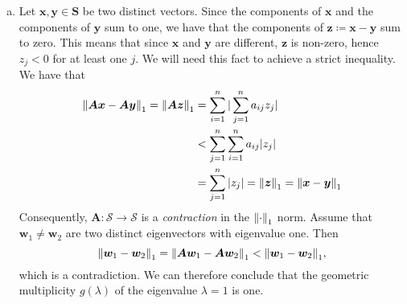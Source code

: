 \documentclass[12pt, oneside, article, a4paper]{memoir}
\newcommand{\mat}[1]{\bm{#1}}
\begin{document}
\begin{enumerate}[a)]
    \item Let \( \mat{x}, \mat{y} \in \mat{S} \) be two distinct vectors. Since
        the components of \( \mat{x} \) and the components of \( \mat{y} \) sum
        to one, we have that the components of \( \mat{z} \coloneqq \mat{x} -
        \mat{y} \) sum to zero. This means that since \( \mat{x} \) and \(
        \mat{y} \) are different, \( \mat{z} \) is non-zero, hence \(z_j < 0 \)
        for at least one \( j \). We will need this fact to achieve a strict
        inequality. We have that
        \begin{align}
            \begin{split}
            \norm{\mat{Ax} - \mat{Ay}}_1 = \norm{\mat{Az}}_1 &= \sum_{i = 1}^n |\sum_{j=1}^n a_{ij} z_j| \\
                                                             &< \sum_{j = 1}^n \sum_{i=1}^n a_{ij}|z_j| \\ 
                                                             &= \sum_{j=1}^n |z_j| = \norm{\mat{z}}_1 = \norm{\mat{x} - \mat{y}}_1
    \end{split}
        \end{align}
        Consequently, \( \mat{A} \colon \mathcal{S} \to \mathcal{S} \) is a
        \emph{contraction} in the \( \norm{\cdot}_1 \) norm.  Assume that \(
        \mat{w}_1 \neq \mat{w}_2 \) are two distinct eigenvectors with
        eigenvalue one. Then
        \begin{equation}
            \norm{\mat{w}_1 - \mat{w}_2}_1 = \norm{\mat{Aw}_1 - \mat{Aw}_2}_1 < \norm{\mat{w}_1 - \mat{w}_2}_1,
        \end{equation}
        which is a contradiction. We can therefore conclude that the geometric
        multiplicity \( g(\lambda) \) of the eigenvalue \( \lambda = 1 \) is
        one.
\end{enumerate}
\end{document}
